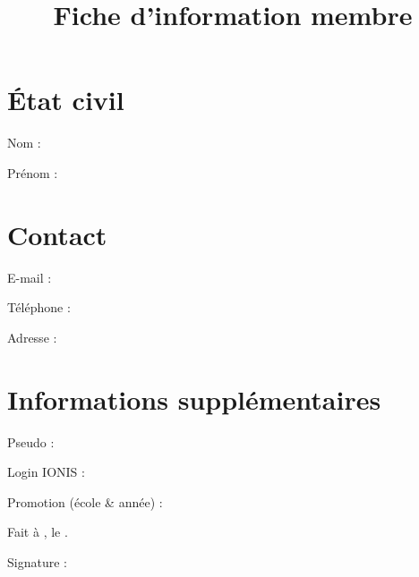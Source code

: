 \documentclass[a4paper,12pt]{prologin}
\title{Fiche d'information membre}
\begin{document}
\section*{État civil}

Nom : \hrulefill

Prénom : \hrulefill

\section*{Contact}

E-mail : \hrulefill

Téléphone : \hrulefill

Adresse : \hrulefill

\hrulefill

\section*{Informations supplémentaires}
Pseudo : \hrulefill

Login IONIS : \hrulefill

Promotion (école \& année) : \hrulefill

\vspace{2cm}

Fait à \hrulefill, le \hrulefill.

Signature :
\end{document}
